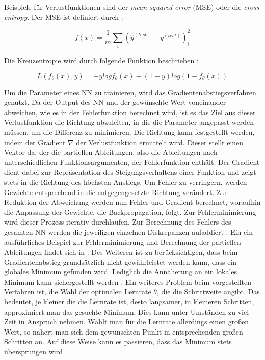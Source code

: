 \documentclass[12pt,a4paper]{article}
\begin{document}
Beispiele für Verlustfunktionen sind der \textit{mean squared error} (MSE) oder die \textit{cross entropy}.
Der MSE ist definiert durch \cite[S. 101]{Goodfellow2015}: 

\begin{equation}
f(x) = \frac{1}{m} \sum_{i} ( \hat{y}^{(test)} - y^{(test)} ) ^{2}_{i}
\end{equation}

Die Kreuzentropie wird durch folgende Funktion beschrieben \cite[S. 166]{Goodfellow2015}:

\begin{equation}
L(f_\theta (x), y) = -y log f_\theta (x) - (1 - y) log(1 - f_\theta(x))
\end{equation}

Um die Parameter eines NN zu trainieren, wird das Gradientenabstiegsverfahren genutzt. Da der Output des NN und der gewünschte Wert voneinander abweichen, wie es in der Fehlerfunktion berechnet wird, ist es das Ziel aus dieser Verlustfunktion die Richtung abzuleiten, in die die Parameter angepasst werden müssen, um die Differenz zu minimieren. Die Richtung kann festgestellt werden, indem der Gradient $ \nabla $ der Verlustfunktion ermittelt wird. Dieser stellt einen Vektor da, der die partiellen Ableitungen, also die Ableitungen nach unterschiedlichen Funktionsargumenten, der Fehlerfunktion enthält. Der Gradient dient dabei zur Repräsentation des Steigungsverhaltens einer Funktion und zeigt stets in die Richtung des höchsten Anstiegs. Um Fehler zu verringern, werden Gewichte entsprechend in die entgegengesetzte Richtung verändert. Zur Reduktion der Abweichung werden nun Fehler und Gradient berechnet, woraufhin die Anpassung der Gewichte, die Backpropagation, folgt. Zur Fehlerminimierung wird dieser Prozess iterativ durchlaufen. Zur Berechnung des Fehlers des gesamten NN werden die jeweiligen einzelnen Diskrepanzen aufaddiert \cite[S. 58-60]{Kruse2015}. Ein ein ausführliches Beispiel zur Fehlerminimierung und Berechnung der partiellen Ableitungen findet sich in \cite[S. 64-68]{Kruse2015}.
Des Weiteren ist zu berücksichtigen, dass beim Gradientenabstieg grundsätzlich nicht gewährleistet werden kann, dass ein globales Minimum gefunden wird. Lediglich die Annäherung an ein lokales Minimum kann sichergestellt werden \cite[S. 69]{Kruse2015}. Ein weiteres Problem beim vorgestellten Verfahren ist, die Wahl der optimalen Lernrate $ \theta $, die die Schrittweite angibt. Das bedeutet, je kleiner die die Lernrate ist, desto langsamer, in kleineren Schritten, approximiert man das gesuchte Minimum. Dies kann unter Umständen zu viel Zeit in Anspruch nehmen. Wählt man für die Lernrate allerdings einen großen Wert, so nähert man sich dem gewünschten Punkt in entsprechenden großen Schritten an. Auf diese Weise kann es passieren, dass das Minimum stets übersprungen wird \cite[S. 67]{Kruse2015}. 
\end{document}
